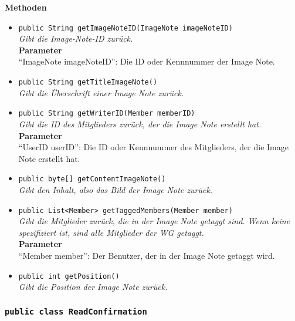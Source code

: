 	\textbf{Methoden}
	\begin{itemize}
		\item\texttt{{public String getImageNoteID(ImageNote imageNoteID)}}\\
		\textit{Gibt die Image-Note-ID zurück.}\\
		\textbf{Parameter}\\
		“ImageNote imageNoteID”: Die ID oder Kennnummer der Image Note.\\
		
		\item\texttt{{public String getTitleImageNote()}}\\
		\textit{Gibt die Überschrift einer Image Note zurück.}\\
		
		\item\texttt{{public String getWriterID(Member memberID)}}\\
		\textit{Gibt die ID des Mitglieders zurück, der die Image Note erstellt hat.}\\
		\textbf{Parameter}\\
		“UserID userID”: Die ID oder Kennnummer des Mitglieders, der die Image Note erstellt hat.\\
		
		\item\texttt{{public byte[] getContentImageNote()}}\\
		\textit{Gibt den Inhalt, also das Bild der Image Note zurück.}\\
		
		\item\texttt{{public List<Member> getTaggedMembers(Member member)}}\\
		\textit{Gibt die Mitglieder zurück, die in der Image Note getaggt sind. Wenn keine spezifiziert ist, sind alle Mitglieder der WG getaggt.}\\
		\textbf{Parameter}\\
		“Member member”: Der Benutzer, der in der Image Note getaggt wird.\\
		
		\item\texttt{{public int getPosition()}}\\
		\textit{Gibt die Position der Image Note zurück.}\\
	\end{itemize}

\subsubsection{\texttt{public class ReadConfirmation}}

